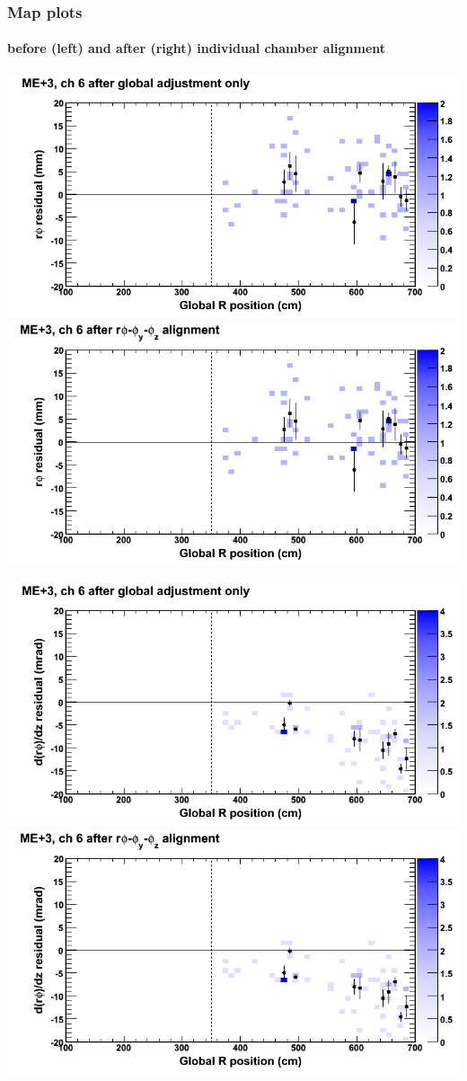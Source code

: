 \documentclass[compress]{beamer}
\begin{document}
\begin{frame}
\frametitle{Map plots}
\framesubtitle{before (left) and after (right) individual chamber alignment}
\includegraphics[width=0.5\linewidth]{ringmapplots_3dof/before_CSCvsr_mep3ch06_x.png} \includegraphics[width=0.5\linewidth]{ringmapplots_3dof/after_CSCvsr_mep3ch06_x.png}

\includegraphics[width=0.5\linewidth]{ringmapplots_3dof/before_CSCvsr_mep3ch06_dxdz.png} \includegraphics[width=0.5\linewidth]{ringmapplots_3dof/after_CSCvsr_mep3ch06_dxdz.png}
\end{frame}
\end{document}

